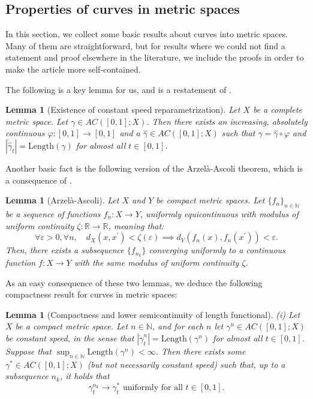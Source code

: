 \documentclass[aos, preprint]{imsart}
\theoremstyle{plain}
\newtheorem{lem}[theorem]{Lemma}
\theoremstyle{remark}
\begin{document}



\begin{appendix}

\section{Properties of curves in metric spaces}\label{appn:cptness}
In this section, we collect some basic results about curves into metric spaces. Many of them are straightforward, but for results where we could not find a statement and proof elsewhere in the literature, we include the proofs in order to make the article more self-contained.

The following is a key lemma for us, and is a restatement of \cite[Lemma
1.1.4(b)]{ambrosio2008gradient}.
\begin{lem}[Existence of constant speed reparametrization]
\label{lem:const-speed-reparam}
 Let $X$ be a complete metric space. Let $\gamma\in AC([0,1];X)$.
Then there exists an increasing, absolutely continuous $\varphi:[0,1]\rightarrow[0,1]$
and a $\hat{\gamma}\in AC([0,1];X)$ such that $\gamma=\hat{\gamma}\circ\varphi$
and $|\dot{\hat{\gamma}}_{t}|=\text{Length}(\gamma)$ for almost all
$t\in[0,1]$.
\end{lem}



Another basic fact is the following version of the Arzel\`a-Ascoli theorem, which is
a consequence
of \cite[Vol. 1, Ch. II, §18, Thm. 7]{kolmogorov1999elements}.
\begin{lem}[Arzel\`a-Ascoli]
  \label{thm:arzela-ascoli}
  Let $X$ and $Y$ be compact metric spaces.
  Let $\{f_{n}\}_{n\in\mathbb{N}}$ be a sequence of functions $f_n: X\to Y$,  \emph{uniformly equicontinuous}
  with \emph{modulus of uniform
    continuity }$\zeta:\mathbb{R}\rightarrow\mathbb{R}$, meaning that:
  \[
    \forall\varepsilon>0, \forall n,\quad
    d_{X}(x,x^{\prime})<\zeta(\varepsilon)\implies
    d_{Y}(f_{n}(x),f_{n}(x^{\prime}))<\varepsilon.
  \]
  Then,
   there exists a subsequence $\{f_{n_{k}}\}$ converging uniformly to a continuous function $f:X\rightarrow Y$ with the same   modulus of uniform
  continuity $\zeta$.
\end{lem}

As an easy consequence of these two lemmas,  we deduce the following compactness result for curves in metric spaces:

\begin{lem}[Compactness and lower semicontinuity of length functional]
\label{lem:length-is-lsc}  (i) Let $X$ be a compact metric space.
Let $n\in\mathbb{N}$, and for each $n$ let $\gamma^{n}\in AC([0,1];X)$
be constant speed, in the sense that $|\dot{\gamma}_{t}^{n}|=\text{Length}(\gamma^{n})$
for almost all $t\in[0,1]$. Suppose that $\sup_{n\in\mathbb{N}}\text{Length}(\gamma^{n})<\infty$.
Then there exists some $\gamma^{*}\in AC([0,1];X)$ (but not necessarily
constant speed) such that, up to a subsequence $n_{k}$, it holds
that
\[
\gamma_{t}^{n_{k}}\rightarrow\gamma_{t}^{*}\text{ uniformly for all }t\in[0,1].
\]


\end{lem}
\end{appendix}
\end{document}
